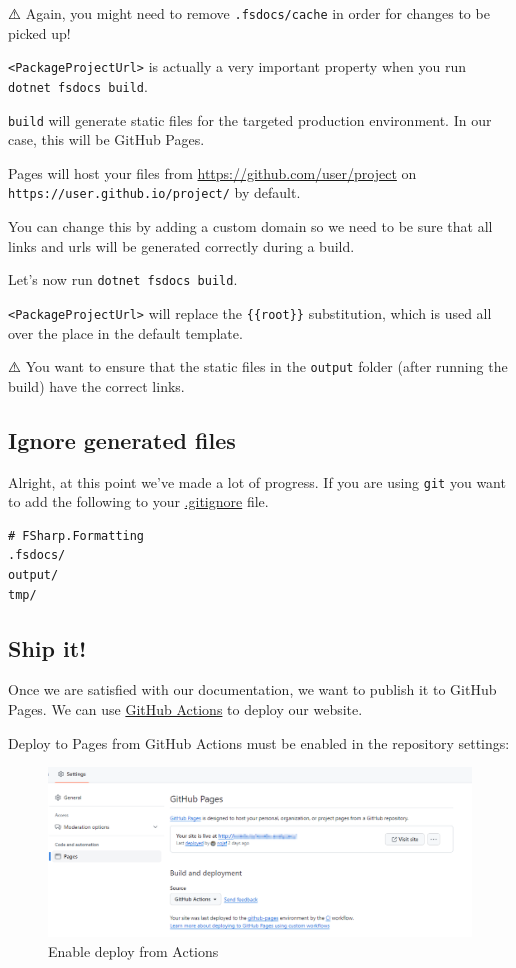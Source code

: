 \documentclass{article}
\begin{document}
⚠️ Again, you might need to remove \texttt{.fsdocs/cache} in order for changes to be picked up!


\texttt{<PackageProjectUrl>} is actually a very important property when you run \texttt{dotnet fsdocs build}.

\texttt{build} will generate static files for the targeted production environment. In our case, this will be GitHub Pages.


Pages will host your files from \href{https://github.com/user/project}{https://github.com/user/project} on \texttt{https://user.github.io/project/} by default.

You can change this by adding a custom domain so we need to be sure that all links and urls will be generated correctly during a build.


Let's now run \texttt{dotnet fsdocs build}.


\texttt{<PackageProjectUrl>} will replace the \texttt{\{\{root\}\}} substitution, which is used all over the place in the default template.


⚠️ You want to ensure that the static files in the \texttt{output} folder (after running the build) have the correct links.
\subsection*{Ignore generated files}



Alright, at this point we've made a lot of progress. If you are using \texttt{git} you want to add the following to your \href{https://git-scm.com/docs/gitignore}{.gitignore} file.
\begin{lstlisting}
# FSharp.Formatting
.fsdocs/
output/
tmp/

\end{lstlisting}
\subsection*{Ship it!}



Once we are satisfied with our documentation, we want to publish it to GitHub Pages.
We can use \href{https://github.com/features/actions}{GitHub Actions} to deploy our website.


Deploy to Pages from GitHub Actions must be enabled in the repository settings:


\begin{figure}[htbp]\centering
\includegraphics[width=1.0\textwidth]{./content/img/github-pages-settings.png}
\caption{Enable deploy from Actions}
\end{figure}
\end{document}
